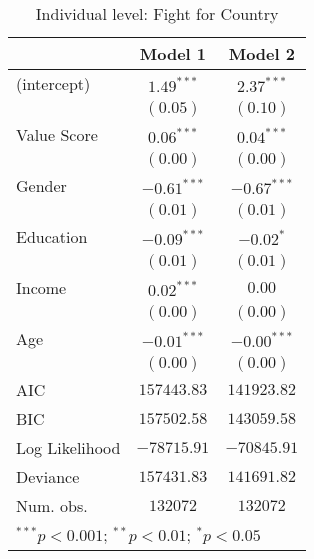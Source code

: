 
\begin{table}
\begin{center}
\begin{tabular}{l c c}
\toprule
 & Model 1 & Model 2 \\
\midrule
(intercept)    & $1.49^{***}$  & $2.37^{***}$  \\
               & $(0.05)$      & $(0.10)$      \\
Value Score    & $0.06^{***}$  & $0.04^{***}$  \\
               & $(0.00)$      & $(0.00)$      \\
Gender         & $-0.61^{***}$ & $-0.67^{***}$ \\
               & $(0.01)$      & $(0.01)$      \\
Education      & $-0.09^{***}$ & $-0.02^{*}$   \\
               & $(0.01)$      & $(0.01)$      \\
Income         & $0.02^{***}$  & $0.00$        \\
               & $(0.00)$      & $(0.00)$      \\
Age            & $-0.01^{***}$ & $-0.00^{***}$ \\
               & $(0.00)$      & $(0.00)$      \\
\midrule
AIC            & $157443.83$   & $141923.82$   \\
BIC            & $157502.58$   & $143059.58$   \\
Log Likelihood & $-78715.91$   & $-70845.91$   \\
Deviance       & $157431.83$   & $141691.82$   \\
Num. obs.      & $132072$      & $132072$      \\
\bottomrule
\multicolumn{3}{l}{\scriptsize{$^{***}p<0.001$; $^{**}p<0.01$; $^{*}p<0.05$}}
\end{tabular}
\caption{Individual level: Fight for Country}
\label{FCREG}
\end{center}
\end{table}
